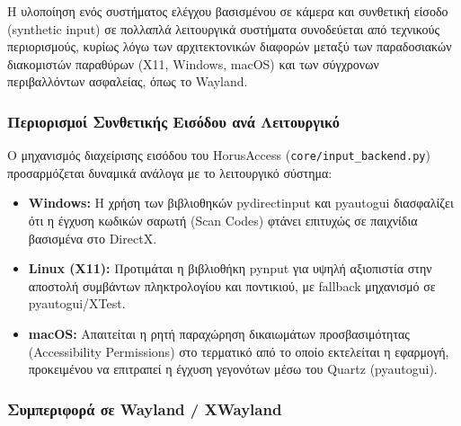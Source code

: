 \documentclass[twoside, a4paper, 11pt]{article}
\newcommand{\textlatin}[1]{\textenglish{#1}}
\begin{document}
Η υλοποίηση ενός συστήματος ελέγχου βασισμένου σε κάμερα και συνθετική είσοδο (\textlatin{synthetic input}) σε πολλαπλά λειτουργικά συστήματα συνοδεύεται από τεχνικούς περιορισμούς, κυρίως λόγω των αρχιτεκτονικών διαφορών μεταξύ των παραδοσιακών διακομιστών παραθύρων (\textlatin{X11, Windows, macOS}) και των σύγχρονων περιβαλλόντων ασφαλείας, όπως το \textlatin{Wayland}.

\subsubsection{Περιορισμοί Συνθετικής Εισόδου ανά Λειτουργικό}

Ο μηχανισμός διαχείρισης εισόδου του \textlatin{HorusAccess} (\texttt{core/input\_backend.py}) προσαρμόζεται δυναμικά ανάλογα με το λειτουργικό σύστημα:
\begin{itemize}
    \item \textbf{Windows:} Η χρήση των βιβλιοθηκών \textlatin{pydirectinput} και \textlatin{pyautogui} διασφαλίζει ότι η έγχυση κωδικών σαρωτή (\textlatin{Scan Codes}) φτάνει επιτυχώς σε παιχνίδια βασισμένα στο \textlatin{DirectX}.
    \item \textbf{Linux (X11):} Προτιμάται η βιβλιοθήκη \textlatin{pynput} για υψηλή αξιοπιστία στην αποστολή συμβάντων πληκτρολογίου και ποντικιού, με \textlatin{fallback} μηχανισμό σε \textlatin{pyautogui/XTest}.
    \item \textbf{macOS:} Απαιτείται η ρητή παραχώρηση δικαιωμάτων προσβασιμότητας (\textlatin{Accessibility Permissions}) στο τερματικό από το οποίο εκτελείται η εφαρμογή, προκειμένου να επιτραπεί η έγχυση γεγονότων μέσω του \textlatin{Quartz} (\textlatin{pyautogui}).
\end{itemize}

\subsubsection{Συμπεριφορά σε Wayland / XWayland}
\end{document}
